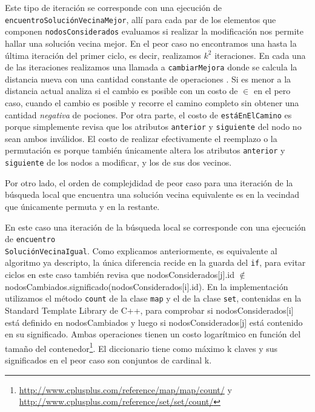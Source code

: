 Este tipo de iteraci\'on se corresponde con una ejecuci\'on de \texttt{encuentroSoluci\'onVecinaMejor}, all\'i para cada par de los elementos que componen \texttt{nodosConsiderados} evaluamos si realizar la modificaci\'on nos permite hallar una soluci\'on vecina mejor. En el peor caso no encontramos una hasta la \'ultima iteraci\'on del primer ciclo, es decir, realizamos $k^2$ iteraciones. En cada una de las iteraciones realizamos una llamada a \texttt{cambiarMejora} donde se calcula la distancia nueva con una cantidad constante de operaciones . Si es menor a la distancia actual analiza si el cambio es posible con un costo de  $\in$  en el pero caso, cuando el cambio es posible y recorre el camino completo sin obtener una cantidad \textit{negativa} de pociones. Por otra parte, el costo de \texttt{est\'aEnElCamino} es  porque simplemente revisa que los atributos \texttt{anterior} y \texttt{siguiente} del nodo no sean ambos inv\'alidos. El costo de realizar efectivamente el reemplazo o la permutaci\'on es  porque tambi\'en \'unicamente altera los atributos \texttt{anterior} y \texttt{siguiente} de los nodos a modificar, y los de sus dos vecinos.

Por otro lado, el orden de complejdidad de peor caso para una iteraci\'on de la b\'usqueda local que encuentra una soluci\'on vecina equivalente es  en la vecindad que \'unicamente permuta y  en la restante.

En este caso una iteraci\'on de la b\'usqueda local se corresponde con una ejecuci\'on de \texttt{encuentro\\ Soluci\'onVecinaIgual}. Como explicamos anteriormente, es equivalente al algoritmo ya descripto, la \'unica diferencia recide en la guarda del \texttt{if}, para evitar ciclos en este caso tambi\'en revisa que nodosConsiderados[j].id $\notin$ nodosCambiados.significado(nodosConsiderados[i].id). En la implementaci\'on utilizamos el m\'etodo \texttt{count} de la clase \texttt{map} y el de la clase \texttt{set}, contenidas en la Standard Template Library de C++, para comprobar si nodosConsiderados[i] est\'a definido en nodosCambiados y luego si nodosConsiderados[j] est\'a contenido en su significado. Ambas operaciones tienen un costo logar\'itmico en funci\'on del tamaño del contenedor\footnote{\url{http://www.cplusplus.com/reference/map/map/count/} y \url{http://www.cplusplus.com/reference/set/set/count/}}. El diccionario tiene como m\'aximo k claves y sus significados en el peor caso son conjuntos de cardinal k.

